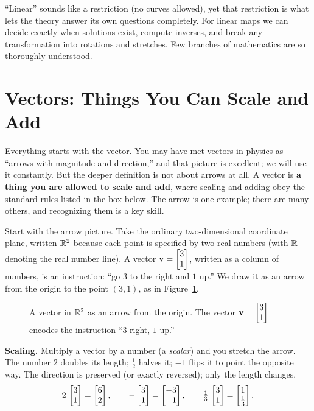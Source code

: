 \begin{aestheticbox}
``Linear'' sounds like a restriction (no curves allowed), yet that restriction is what lets the theory
answer its own questions completely. For linear maps we can decide exactly when solutions exist,
compute inverses, and break any transformation into rotations and stretches. Few branches of
mathematics are so thoroughly understood.
\end{aestheticbox}

\section{Vectors: Things You Can Scale and Add}

Everything starts with the vector. You may have met vectors in physics as ``arrows with magnitude and
direction,'' and that picture is excellent; we will use it constantly. But the deeper definition is
not about arrows at all. A vector is \textbf{a thing you are allowed to scale and add}, where
scaling and adding obey the standard rules listed in the box below. The arrow is one example; there are
many others, and recognizing them is a key skill.

Start with the arrow picture. Take the ordinary
two-dimensional coordinate plane, written $\mathbb{R}^2$ because each point is specified by two real numbers
(with $\mathbb{R}$ denoting the real number line). A vector $\mathbf{v} = \begin{bmatrix}3\\1\end{bmatrix}$, written as a column of
numbers, is an instruction:
``go $3$ to the right and $1$ up.'' We draw it as an arrow from the origin to the point $(3,1)$, as in Figure~\ref{ch01:arrow}.

\begin{figure}[H]
\centering
{}
\caption{A vector in $\mathbb{R}^2$ as an arrow from the origin. The vector $\mathbf{v}=\begin{bmatrix}3\\1\end{bmatrix}$ encodes the
instruction ``$3$ right, $1$ up.''}
\label{ch01:arrow}
\end{figure}

\textbf{Scaling.} Multiply a vector by a number (a \emph{scalar}) and you stretch the arrow. The number
$2$ doubles its length; $\tfrac12$ halves it; $-1$ flips it to point the opposite way. The direction is
preserved (or exactly reversed); only the length changes.
\[
2\,\begin{bmatrix}3\\1\end{bmatrix} = \begin{bmatrix}6\\2\end{bmatrix},\qquad
-\begin{bmatrix}3\\1\end{bmatrix} = \begin{bmatrix}-3\\-1\end{bmatrix},\qquad
\tfrac13\,\begin{bmatrix}3\\1\end{bmatrix} = \begin{bmatrix}1\\\tfrac13\end{bmatrix}.
\]

